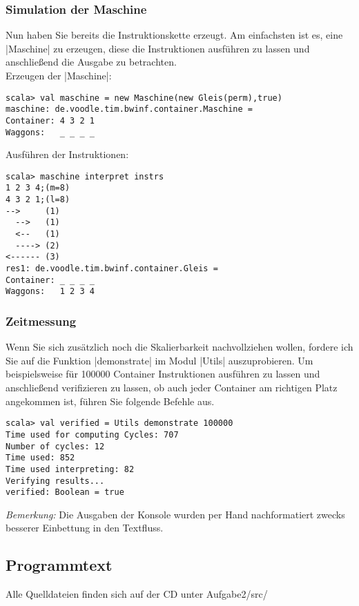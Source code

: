 \subsubsection{Simulation der Maschine}
Nun haben Sie bereits die Instruktionskette erzeugt.
Am einfachsten ist es, eine |Maschine| zu erzeugen, diese die Instruktionen ausführen zu lassen und anschließend die Ausgabe zu betrachten. \\
Erzeugen der |Maschine|:
\begin{lstlisting}
scala> val maschine = new Maschine(new Gleis(perm),true)
maschine: de.voodle.tim.bwinf.container.Maschine = 
Container: 4 3 2 1
Waggons:   _ _ _ _
\end{lstlisting}
Ausführen der Instruktionen:
\begin{lstlisting}
scala> maschine interpret instrs
1 2 3 4;(m=8)
4 3 2 1;(l=8)
-->     (1)
  -->   (1)
  <--   (1)
  ----> (2)
<------ (3)
res1: de.voodle.tim.bwinf.container.Gleis = 
Container: _ _ _ _
Waggons:   1 2 3 4
\end{lstlisting}
\subsubsection{Zeitmessung}
Wenn Sie sich zusätzlich noch die Skalierbarkeit nachvollziehen wollen,
fordere ich Sie auf die Funktion |demonstrate| im Modul |Utils| auszuprobieren.
Um beispielsweise für 100000 Container Instruktionen ausführen zu lassen und anschließend verifizieren zu lassen,
ob auch jeder Container am richtigen Platz angekommen ist, führen Sie folgende Befehle aus.
\begin{lstlisting}
scala> val verified = Utils demonstrate 100000 
Time used for computing Cycles: 707
Number of cycles: 12
Time used: 852
Time used interpreting: 82
Verifying results...
verified: Boolean = true
\end{lstlisting}

\begin{flushright}
\begin{footnotesize}
\emph{Bemerkung:} Die Ausgaben der Konsole wurden per Hand nachformatiert zwecks besserer Einbettung in den Textfluss.
\end{footnotesize}
\end{flushright}

\newpage
\subsection{Programmtext}
Alle Quelldateien finden sich auf der CD unter Aufgabe2/src/
